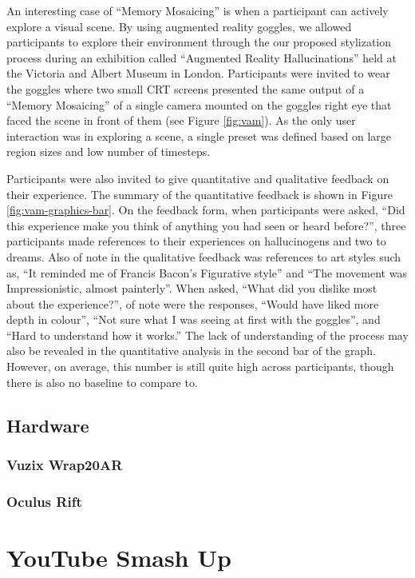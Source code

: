 \documentclass[a4paper,10pt,final]{ThesisStyle}
\begin{document}
An interesting case of ``Memory Mosaicing'' is when a participant can actively explore a visual scene.  By using augmented reality goggles, we allowed participants to explore their environment through the our proposed stylization process during an exhibition called ``Augmented Reality Hallucinations'' held at the Victoria and Albert Museum in London.  Participants were invited to wear the goggles where two small CRT screens presented the same output of a ``Memory Mosaicing'' of a single camera mounted on the goggles right eye that faced the scene in front of them (see Figure \ref{fig:vam}).  As the only user interaction was in exploring a scene, a single preset was defined based on large region sizes and low number of timesteps.  

Participants were also invited to give quantitative and qualitative feedback on their experience.  The summary of the quantitative feedback is shown in Figure \ref{fig:vam-graphics-bar}.  On the feedback form, when participants were asked, ``Did this experience make you think of anything you had seen or heard before?'', three participants made references to their experiences on hallucinogens and two to dreams.  Also of note in the qualitative feedback was references to art styles such as, ``It reminded me of Francis Bacon's Figurative style'' and ``The movement was Impressionistic, almost painterly''.  When asked, ``What did you dislike most about the experience?'', of note were the responses, ``Would have liked more depth in colour'', ``Not sure what I was seeing at first with the goggles'', and ``Hard to understand how it works.''  The lack of understanding of the process may also be revealed in the quantitative analysis in the second bar of the graph.  However, on average, this number is still quite high across participants, though there is also no baseline to compare to.  

\subsection{Hardware}
\subsubsection{Vuzix Wrap20AR}
\subsubsection{Oculus Rift}


\section{YouTube Smash Up}
\end{document}
